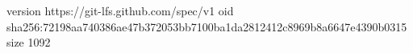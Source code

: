 version https://git-lfs.github.com/spec/v1
oid sha256:72198aa740386ae47b372053bb7100ba1da2812412c8969b8a6647e4390b0315
size 1092
